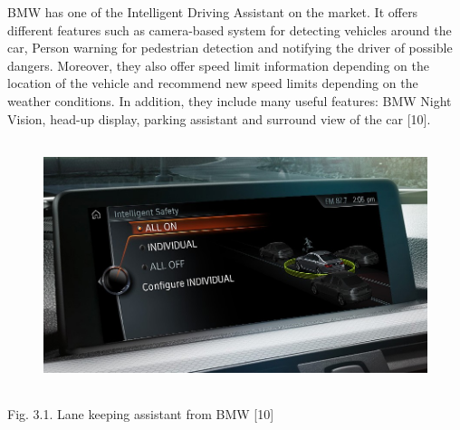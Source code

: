 \documentclass[12pt]{report}
\renewcommand{\_}{\kern-1.5pt\textunderscore\kern-1.5pt}
\begin{document}
BMW has one of the Intelligent Driving Assistant on the market. It offers different features such as camera-based system for detecting vehicles around the car, Person warning for pedestrian detection and notifying the driver of possible dangers. Moreover, they also offer speed limit information depending on the location of the vehicle and recommend new speed limits depending on the weather conditions. In addition, they include many useful features: BMW Night Vision, head-up display, parking assistant and surround view of the car [10].\par


\vspace{\baselineskip}

\vspace{\baselineskip}



\begin{figure}[H]
\advance\leftskip 0.02in		\includegraphics[width=5.06in,height=2.85in]{./media/image10.png}
\end{figure}



\par

Fig. 3.1. Lane keeping assistant from BMW [10]\par


\vspace{\baselineskip}

\vspace{\baselineskip}

\vspace{\baselineskip}

\vspace{\baselineskip}
\end{document}
